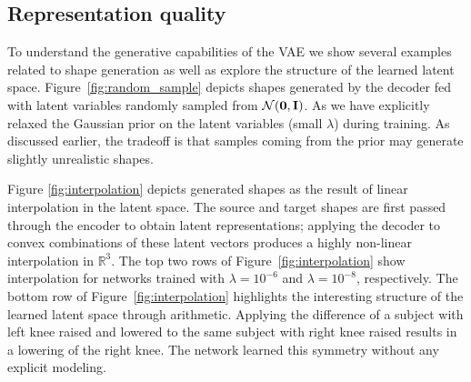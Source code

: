 \subsection{Representation quality}
To understand the generative capabilities of the VAE we show several examples related to shape generation as well as explore the structure of the learned latent space.
Figure~\ref{fig:random_sample} depicts shapes generated by the decoder fed with latent variables randomly sampled from $\mathcal{N}(\bm{\mathrm{0}},\bm{\mathrm{I}})$. As we have explicitly relaxed the Gaussian prior on the latent variables (small $\lambda$) during training. As discussed earlier, the tradeoff is that samples coming from the prior may generate slightly unrealistic shapes.

Figure \ref{fig:interpolation} depicts generated shapes as the result of linear interpolation in the latent space. The source and target shapes are first passed through the encoder to obtain latent representations; applying the decoder to convex combinations of these latent vectors produces a highly non-linear interpolation in $\mathbb{R}^3$. The top two rows of Figure~\ref{fig:interpolation} show interpolation for networks trained with $\lambda=10^{-6}$ and $\lambda=10^{-8}$, respectively. The bottom row of Figure~\ref{fig:interpolation} highlights the interesting structure of the learned latent space through arithmetic. Applying the difference of a subject with left knee raised and lowered to the same subject with right knee raised results in a lowering of the right knee. The network learned this symmetry without any explicit modeling.


